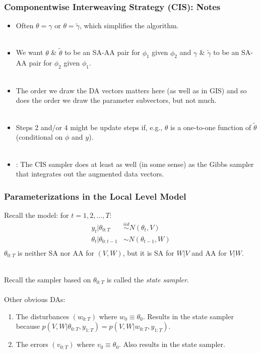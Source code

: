 \documentclass[xcolor=dvipsnames]{beamer}
\begin{document}
\begin{frame}
  \frametitle{Componentwise Interweaving Strategy (CIS): Notes}
\begin{itemize}
  \item Often $\theta=\gamma$ or $\theta=\tilde{\gamma}$, which simplifies the algorithm.\\~\\
  \item We want $\theta$ \& $\tilde{\theta}$ to be an SA-AA pair for $\phi_1$ given $\phi_2$ and $\gamma$ \& $\tilde{\gamma}$ to be an SA-AA pair for $\phi_2$ given $\phi_1$.\\~\\
  \item The order we draw the DA vectors matters here (as well as in GIS) and so does the order we draw the parameter subvectors, but not much.\\~\\
  \item Steps 2 and/or 4 might be update steps if, e.g., $\theta$ is a one-to-one function of $\tilde{\theta}$ (conditional on $\phi$ and $y$).\\~\\
  \item \citet{yu2011center}: The CIS sampler does at least as well (in some sense) as the Gibbs sampler that integrates out the augmented data vectors.
\end{itemize}
\end{frame}

\begin{frame}
  \frametitle{Parameterizations in the Local Level Model}
Recall the model: for $t=1,2,...,T$:
\begin{align*}
  y_t|\theta_{0:T} &\stackrel{iid}{\sim} N(\theta_t,V)\\
  \theta_t|\theta_{0:t-1} &\sim N(\theta_{t-1},W)\\
\end{align*}
$\theta_{0:T}$ is neither SA nor AA for $(V,W)$, but it is SA for $W|V$ and AA for $V|W$.\\~\\\pause

Recall the sampler based on $\theta_{0:T}$ is called the {\it \color{red} state sampler}.\\~\\

Other obvious DAs: 
\begin{enumerate}
  \item The disturbances $(w_{0:T})$ where $w_0\equiv \theta_0$. Results in the state sampler because $p(V,W|\theta_{0:T},y_{1:T})=p(V,W|w_{0:T},y_{1:T})$.
  \item The errors $(v_{0:T})$ where $v_0\equiv \theta_0$. Also results in the state sampler.
\end{enumerate}
\end{frame}
\end{document}
